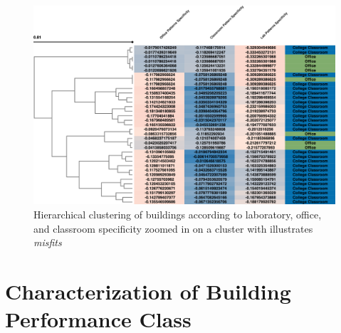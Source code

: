 \begin{figure}[ht!]
\begin{center}
\includegraphics[width=1\columnwidth]{figures/clusteringweekly_zoom/clusteringweekly_zoom}
\caption{{Hierarchical clustering of buildings according to laboratory, office, and classroom specificity zoomed in on a cluster with illustrates \emph{misfits}
\label{fig:specificity_misfit}%
}}
\end{center}
\end{figure}

\section{Characterization of Building Performance Class}
\label{sec:results_benchmarking}

